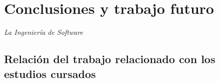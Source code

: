 \chapter{Conclusiones y trabajo futuro}
\textit{La Ingeniería de Software}

\section{Relación del trabajo relacionado con los estudios cursados}
